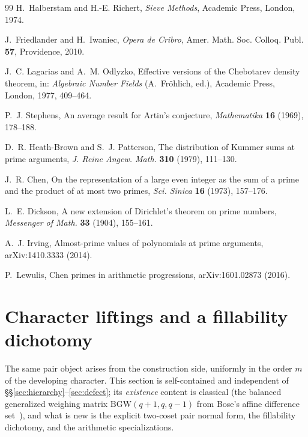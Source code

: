 \documentclass[11pt]{article}
\theoremstyle{plain}
\theoremstyle{definition}
\theoremstyle{remark}
\begin{document}
\begin{thebibliography}{99}
 H.~Halberstam and H.-E. Richert, \emph{Sieve Methods},
Academic Press, London, 1974.

 J.~Friedlander and H.~Iwaniec, \emph{Opera de Cribro},
Amer. Math. Soc. Colloq. Publ. \textbf{57}, Providence, 2010.

 J.~C. Lagarias and A.~M. Odlyzko, Effective versions of
the Chebotarev density theorem, in: \emph{Algebraic Number Fields}
(A.~Fr\"ohlich, ed.), Academic Press, London, 1977, 409--464.

 P.~J. Stephens, An average result for Artin's
conjecture, \emph{Mathematika} \textbf{16} (1969), 178--188.

 D.~R. Heath-Brown and S.~J. Patterson, The distribution
of Kummer sums at prime arguments, \emph{J. Reine Angew. Math.}
\textbf{310} (1979), 111--130.

 J.~R. Chen, On the representation of a large even
integer as the sum of a prime and the product of at most two primes,
\emph{Sci. Sinica} \textbf{16} (1973), 157--176.

 L.~E. Dickson, A new extension of Dirichlet's
theorem on prime numbers, \emph{Messenger of Math.} \textbf{33} (1904),
155--161.

 A.~J. Irving, Almost-prime values of polynomials at
prime arguments, arXiv:1410.3333 (2014).

 P.~Lewulis, Chen primes in arithmetic progressions,
arXiv:1601.02873 (2016).

\end{thebibliography}

\appendix

\section{Character liftings and a fillability dichotomy}
\label{sec:mary}

The same pair object arises from the construction side, uniformly in the order
$m$ of the developing character. This section is self-contained and independent
of \S\S\ref{sec:hierarchy}--\ref{sec:defect}; its \emph{existence} content is
classical (the balanced generalized weighing matrix
$\mathrm{BGW}(q+1,q,q-1)$ from Bose's affine difference
set~\cite{Bose42,Jungnickel82,JK}), and what is new is the explicit two-coset
pair normal form, the fillability dichotomy, and the arithmetic specializations.
\end{document}
